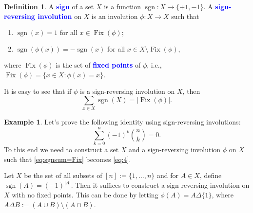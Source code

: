 \documentclass[oneside]{book}
\numberwithin{equation}{section}
\theoremstyle{definition}
\newtheorem{exam}[thm]{Example}
\newtheorem{defn}[thm]{Definition}
\newcommand\Fix{\operatorname{Fix}}
\newcommand\sgn{\operatorname{sgn}}
\renewcommand\emph[1]{\textcolor{blue}{\bf #1}}
\begin{document}
\begin{defn}
  A \emph{sign} of a set \( X \) is a function
  \( \sgn:X \to \{+1,-1\} \). A \emph{sign-reversing involution} on
  \( X \) is an involution \( \phi:X\to X \) such that
  \begin{enumerate}
  \item \( \sgn(x)=1 \) for all \( x\in \Fix(\phi) \);
  \item \( \sgn(\phi(x)) = -\sgn(x) \) for all
  \( x\in X \setminus \Fix(\phi) \),
  \end{enumerate}
  where \( \Fix(\phi) \) is the set of \emph{fixed points} of
  \( \phi \), i.e., \( \Fix(\phi) = \{x\in X: \phi(x) = x \} \).
\end{defn}

It is easy to see that if \( \phi \) is a sign-reversing involution on
\( X \), then
\begin{equation}\label{eq:sgnsum=Fix}
  \sum_{x\in X} \sgn(X) = |\Fix(\phi)|.
\end{equation}

\begin{exam}
  Let's prove the following identity using sign-reversing involutions:
  \begin{equation}\label{eq:4}
    \sum_{k=0}^{n} (-1)^{k} \binom{n}{k} = 0.
  \end{equation}
  To this end we need to construct a set \( X \) and a sign-reversing
  involution \( \phi \) on \( X \) such that \eqref{eq:sgnsum=Fix}
  becomes \eqref{eq:4}.

  Let \( X \) be the set of all subsets of \( [n]:= \{ 1,\dots,n \} \)
  and for \( A\in X \), define \( \sgn(A) = (-1)^{|A|} \). Then it
  suffices to construct a sign-reversing involution on \( X \) with no
  fixed points. This can be done by letting
  \( \phi(A) = A \Delta \{1\} \), where
  \( A \Delta B := (A \cup B) \setminus (A \cap B) \).
\end{exam}
\end{document}
